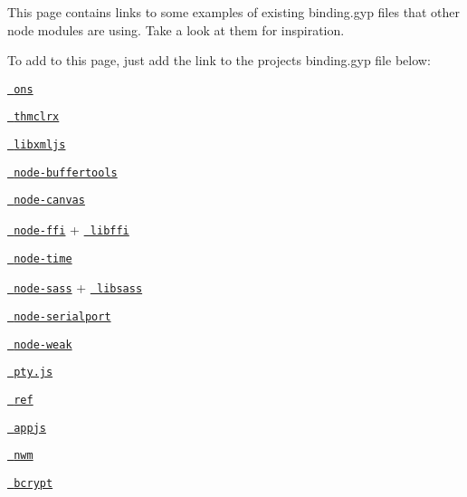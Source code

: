 This page contains links to some examples of existing {\ttfamily binding.\+gyp} files that other node modules are using. Take a look at them for inspiration.

To add to this page, just add the link to the project\textquotesingle{}s {\ttfamily binding.\+gyp} file below\+:


\begin{DoxyItemize}
\item \href{https://github.com/XadillaX/aliyun-ons/blob/master/binding.gyp}{\texttt{ ons}}
\item \href{https://github.com/XadillaX/thmclrx/blob/master/binding.gyp}{\texttt{ thmclrx}}
\item \href{https://github.com/polotek/libxmljs/blob/master/binding.gyp}{\texttt{ libxmljs}}
\item \href{https://github.com/bnoordhuis/node-buffertools/blob/master/binding.gyp}{\texttt{ node-\/buffertools}}
\item \href{https://github.com/LearnBoost/node-canvas/blob/master/binding.gyp}{\texttt{ node-\/canvas}}
\item \href{https://github.com/rbranson/node-ffi/blob/master/binding.gyp}{\texttt{ node-\/ffi}} + \href{https://github.com/rbranson/node-ffi/blob/master/deps/libffi/libffi.gyp}{\texttt{ libffi}}
\item \href{https://github.com/TooTallNate/node-time/blob/master/binding.gyp}{\texttt{ node-\/time}}
\item \href{https://github.com/sass/node-sass/blob/master/binding.gyp}{\texttt{ node-\/sass}} + \href{https://github.com/sass/node-sass/blob/master/src/libsass.gyp}{\texttt{ libsass}}
\item \href{https://github.com/voodootikigod/node-serialport/blob/master/binding.gyp}{\texttt{ node-\/serialport}}
\item \href{https://github.com/TooTallNate/node-weak/blob/master/binding.gyp}{\texttt{ node-\/weak}}
\item \href{https://github.com/chjj/pty.js/blob/master/binding.gyp}{\texttt{ pty.\+js}}
\item \href{https://github.com/TooTallNate/ref/blob/master/binding.gyp}{\texttt{ ref}}
\item \href{https://github.com/milani/appjs/blob/master/binding.gyp}{\texttt{ appjs}}
\item \href{https://github.com/mixu/nwm/blob/master/binding.gyp}{\texttt{ nwm}}
\item \href{https://github.com/ncb000gt/node.bcrypt.js/blob/master/binding.gyp}{\texttt{ bcrypt}}

\end{DoxyItemize}
